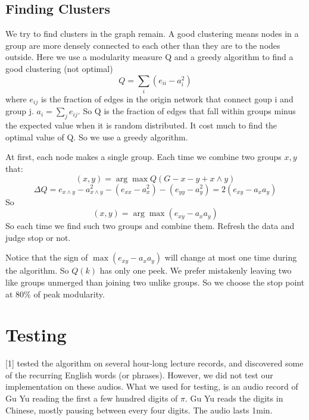 \documentclass{article}
\begin{document}
    \subsection{Finding Clusters}
        We try to find clusters in the graph remain. A good clustering means nodes in
        a group are more densely connected to each other than they are to the nodes
        outside. Here we use a modularity measure Q and a greedy algorithm to find a
        good clustering (not optimal)
        \[ Q = \sum_i (e_{ii} - a_i^2) \]
        where $e_{ij}$ is the fraction of edges in the origin network that connect
        goup i and group j. $a_i = \sum_j e_{ij}$. So Q is the fraction of edges that
        fall within groups minus the expected value when it is random distributed. It
        cost much to find the optimal value of Q. So we use a greedy algorithm.

        At first, each node makes a single group. Each time we combine two groups $x,
        y$ that:
        \[ (x, y) = \arg \max Q (G - x - y + x \wedge y) \]
        \[ \Delta Q = e_{x \wedge y} - a_{x \wedge y}^2 - (e_{xx} - a_x^2) - (e_{yy} -
        a_y^2) = 2 (e_{xy} - a_x a_y) \]
        So
        \[ (x, y) = \arg \max (e_{xy} - a_x a_y) \]
        So each time we find such two groups and combine them. Refresh the data and
        judge stop or not.

        Notice that the sign of $\max (e_{xy} - a_x a_y)$ will change at most one time
        during the algorithm. So $Q (k)$ has only one peek. We prefer mistakenly
        leaving two like groups unmerged than joining two unlike groups. So we choose
        the stop point at 80\% of peak modularity.


\section{Testing}
    [1] tested the algorithm on several hour-long lecture records, and discovered some of the recurring
    English words (or phrases). However, we did not test our implementation on these audios. What we used 
    for testing, is an audio record of Gu Yu reading the first a few hundred digits of $\pi$. Gu Yu reads
    the digits in Chinese, mostly pausing between every four digits. The audio lasts 1min.
\end{document}
